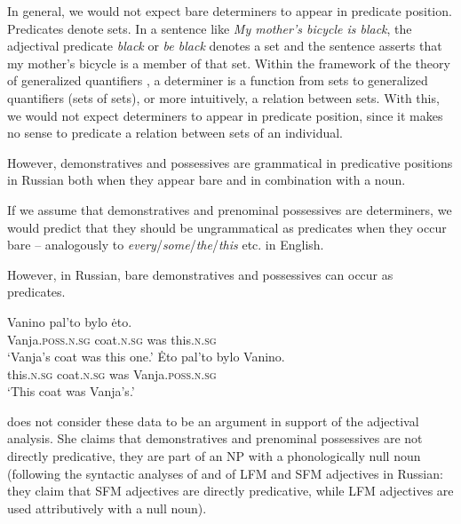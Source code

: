 \documentclass[output=paper,
colorlinks,
citecolor=brown,
newtxmath
]{langscibook}
\begin{document}
In general, we would not expect bare determiners to appear in predicate position. Predicates denote sets. In a sentence like \textit{My mother’s bicycle is black}, the adjectival predicate \textit{black} or \textit{be black} denotes a set and the sentence asserts that my mother’s bicycle is a member of that set. Within the framework of the theory of generalized quantifiers \citep{BarwiseCooper1981}, a determiner is a function from sets to generalized quantifiers (sets of sets), or more intuitively, a relation between sets. With this, we would not expect determiners to appear in predicate position, since it makes no sense to predicate a relation between sets of an individual. 

However, demonstratives and possessives are grammatical in predicative positions in Russian both when they appear bare and in combination with a noun.



If we assume that demonstratives and prenominal possessives are determiners, we would predict that they should be ungrammatical as predicates when they occur bare -- analogously to \textit{every}/\textit{some}/\textit{the}/\textit{this} etc. in English. 

However, in Russian, bare demonstratives and possessives can occur as predicates.


\ea
    \ea \gll Vanino pal'to bylo ėto.\\
    Vanja.\textsc{poss.n.sg} coat.\textsc{n.sg} was this.\textsc{n.sg}\\
    \glt `Vanja's coat was this one.'
    \ex \gll Ėto pal'to bylo Vanino.\\
    this.\textsc{n.sg} coat.\textsc{n.sg} was Vanja.\textsc{poss.n.sg}\\
    \glt `This coat was Vanja's.'
\z\z

\noindent \citet{Pereltsvaig2007} does not consider these data to be an argument in support of the adjectival analysis. She claims that demonstratives and prenominal possessives are not directly predicative, they are part of an NP with a phonologically null noun (following the syntactic analyses of \citealt{Babby1975} and \citealt{Bailyn1994} of LFM and SFM adjectives in Russian: they claim that SFM adjectives are directly predicative, while LFM adjectives are used attributively with a null noun).
\end{document}
